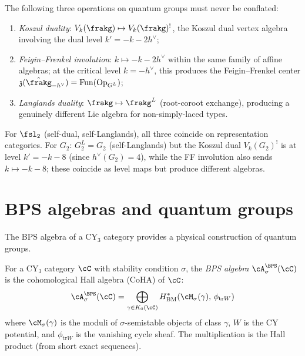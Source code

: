 \begin{remark}
\label{rem:three-operations}
The following three operations on quantum groups must never be
conflated:
\begin{enumerate}[label=(\alph*)]
 \item \emph{Koszul duality}:
 $V_k(\frakg) \mapsto V_k(\frakg)^!$, the Koszul dual vertex
 algebra involving the dual level
 $k' = -k - 2h^\vee$;
 \item \emph{Feigin--Frenkel involution}:
 $k \mapsto -k - 2h^\vee$ within the same family of affine
 algebras; at the critical level $k = -h^\vee$, this produces
 the Feigin--Frenkel center
 $\mathfrak{z}(\hat{\frakg}_{-h^\vee}) = \mathrm{Fun}(
 \mathrm{Op}_{G^L})$;
 \item \emph{Langlands duality}:
 $\frakg \mapsto \frakg^L$ (root-coroot exchange), producing
 a genuinely different Lie algebra for non-simply-laced types.
\end{enumerate}
For $\fsl_2$ (self-dual, self-Langlands), all three coincide on
representation categories. For $G_2$:
$G_2^L = G_2$ (self-Langlands) but the Koszul dual
$V_k(G_2)^!$ is at level $k' = -k - 8$ (since $h^\vee(G_2) = 4$),
while the FF involution also sends $k \mapsto -k-8$; these
coincide as level maps but produce different algebras.
\end{remark}


\section{BPS algebras and quantum groups}
\label{sec:bps-algebras}

The BPS algebra of a CY$_3$ category provides a physical
construction of quantum groups.

\begin{definition}
\label{def:bps-algebra}
For a CY$_3$ category $\cC$ with stability condition $\sigma$,
the \emph{BPS algebra} $\cA^{\BPS}_\sigma(\cC)$ is the
cohomological Hall algebra (CoHA) of $\cC$:
\[
 \cA^{\BPS}_\sigma(\cC)
 = \bigoplus_{\gamma \in K_0(\cC)}
 H^*_{\mathrm{BM}}(\cM_\sigma(\gamma), \, \phi_{\mathrm{tr}W})
\]
where $\cM_\sigma(\gamma)$ is the moduli of $\sigma$-semistable
objects of class $\gamma$, $W$ is the CY potential, and
$\phi_{\mathrm{tr}W}$ is the vanishing cycle sheaf. The
multiplication is the Hall product (from short exact sequences).
\end{definition}

